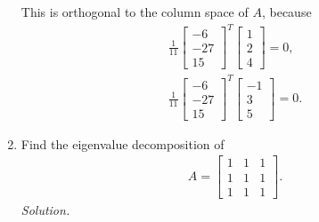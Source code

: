 \documentclass{article}
\begin{document}
\begin{enumerate}
This is orthogonal to the column space of $A$, because
	\begin{align*}
	\frac{1}{11}\left[\begin{array}{l} -6\\-27\\15\end{array}\right]^T \left[\begin{array}{l} 1\\2\\4\end{array}\right]	=0,\\
	\frac{1}{11}\left[\begin{array}{l} -6\\-27\\15\end{array}\right]^T \left[\begin{array}{l} -1\\3\\5\end{array}\right]	=0.
	\end{align*}


\item Find the eigenvalue decomposition of 
	\begin{align*}
	A=\left[ \begin{array}{lll} 1&1&1\\ 1&1&1\\ 1&1&1\end{array}\right].	
	\end{align*}
\emph{Solution.}


\end{enumerate}
\end{document}
